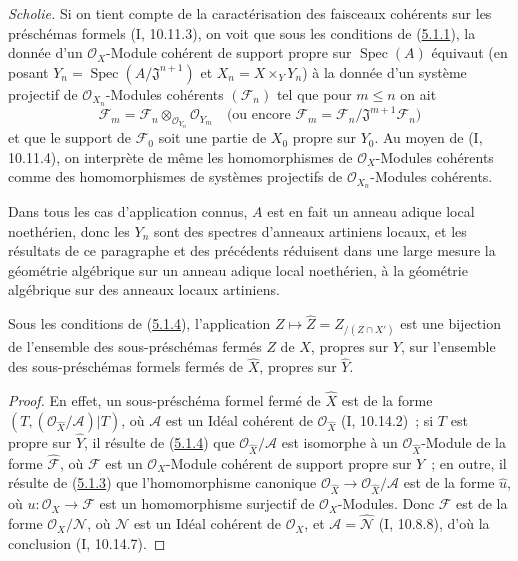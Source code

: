 \begin{env}[5.1.7]
\label{III.5.1.7-fr}
\emph{Scholie.}
Si on tient compte de la caractérisation des faisceaux cohérents sur les préschémas
formels (I, 10.11.3), on voit que sous les conditions de
(\hyperref[III.5.1.1-fr]{5.1.1}), la donnée d'un $\mathcal O_X$-Module cohérent de
support propre sur $\operatorname{Spec}(A)$ équivaut (en posant
$Y_n=\operatorname{Spec}(A/\mathfrak J^{n+1})$ et $X_n=X\times_Y Y_n$) à la donnée
d'un système projectif de $\mathcal O_{X_n}$-Modules cohérents $(\mathcal F_n)$ tel
que pour $m\leq n$ on ait
\[
\mathcal F_m=\mathcal F_n\otimes_{\mathcal O_{Y_n}}\mathcal O_{Y_m}
\quad\text{(ou encore }\mathcal F_m=\mathcal F_n/\mathfrak J^{m+1}\mathcal F_n\text{)}
\]
et que le support de $\mathcal F_0$ soit une partie de $X_0$ propre sur $Y_0$. Au
moyen de (I, 10.11.4), on interprète de même les homomorphismes de
$\mathcal O_X$-Modules cohérents comme des homomorphismes de systèmes projectifs de
$\mathcal O_{X_n}$-Modules cohérents.


Dans tous les cas d'application connus, $A$ est en fait un anneau adique local
noethérien, donc les $Y_n$ sont des spectres d'anneaux artiniens locaux, et les
résultats de ce paragraphe et des précédents réduisent dans une large mesure la
géométrie algébrique sur un anneau adique local noethérien, à la géométrie algébrique
sur des anneaux locaux artiniens.
\end{env}

\begin{corollary}[5.1.8]
\label{III.5.1.8-fr}
Sous les conditions de (\hyperref[III.5.1.4-fr]{5.1.4}), l'application
$Z\mapsto\widehat Z=Z_{/(Z\cap X')}$ est une bijection de l'ensemble des
sous-préschémas fermés $Z$ de $X$, propres sur $Y$, sur l'ensemble des
sous-préschémas formels fermés de $\widehat X$, propres sur $\widehat Y$.
\end{corollary}

\begin{proof}
En effet, un sous-préschéma formel fermé de $\widehat X$ est de la forme
$(T,(\mathcal O_{\widehat X}/\mathcal A)|T)$, où $\mathcal A$ est un Idéal
cohérent de $\mathcal O_{\widehat X}$ (I, 10.14.2)~; si $T$ est propre sur
$\widehat Y$, il résulte de (\hyperref[III.5.1.4-fr]{5.1.4}) que
$\mathcal O_{\widehat X}/\mathcal A$ est isomorphe à un
$\mathcal O_{\widehat X}$-Module de la forme $\widehat{\mathcal F}$, où
$\mathcal F$ est un $\mathcal O_X$-Module cohérent de support propre sur $Y$~; en
outre, il résulte de (\hyperref[III.5.1.3-fr]{5.1.3}) que l'homomorphisme canonique
$\mathcal O_{\widehat X}\to\mathcal O_{\widehat X}/\mathcal A$ est de la forme
$\widehat u$, où $u:\mathcal O_X\to\mathcal F$ est un homomorphisme surjectif de
$\mathcal O_X$-Modules. Donc $\mathcal F$ est de la forme
$\mathcal O_X/\mathcal N$, où $\mathcal N$ est un Idéal cohérent de
$\mathcal O_X$, et $\mathcal A=\widehat{\mathcal N}$ (I, 10.8.8), d'où la
conclusion (I, 10.14.7).
\end{proof}

